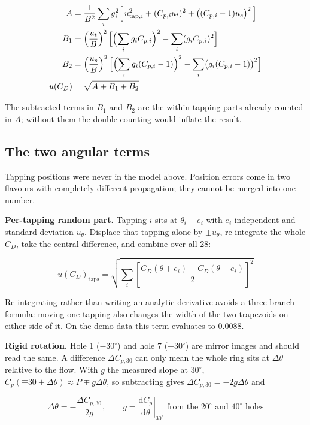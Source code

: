 \documentclass[11pt,a4paper]{article}
\newcommand{\Cp}{\ensuremath{C_p}}
\newcommand{\CD}{\ensuremath{C_D}}
\begin{document}
\begin{align}
A &= \frac{1}{B^2}\sum_i g_i^2\Bigl[\,u_{\text{tap},i}^2 + (C_{p,i} u_t)^2 + \bigl((C_{p,i}-1)u_s\bigr)^2\,\Bigr] \\
B_1 &= \left(\frac{u_t}{B}\right)^2\Bigl[\Bigl(\sum_i g_i C_{p,i}\Bigr)^2 - \sum_i (g_i C_{p,i})^2\Bigr] \\
B_2 &= \left(\frac{u_s}{B}\right)^2\Bigl[\Bigl(\sum_i g_i (C_{p,i}-1)\Bigr)^2 - \sum_i \bigl(g_i (C_{p,i}-1)\bigr)^2\Bigr] \\
u(\CD) &= \sqrt{A + B_1 + B_2}
\end{align}

The subtracted terms in $B_1$ and $B_2$ are the within-tapping parts already counted in $A$;
without them the double counting would inflate the result.

\subsection{The two angular terms}

Tapping positions were never in the model above. Position errors come in two flavours with
completely different propagation; they cannot be merged into one number.

\textbf{Per-tapping random part.} Tapping $i$ sits at $\theta_i + e_i$ with $e_i$ independent and
standard deviation $u_\theta$. Displace that tapping alone by $\pm u_\theta$, re-integrate the whole
\CD, take the central difference, and combine over all 28:

\begin{equation}
u(\CD)_{\text{taps}} = \sqrt{\sum_i \left[\frac{\CD(\theta + e_i) - \CD(\theta - e_i)}{2}\right]^2}
\end{equation}

Re-integrating rather than writing an analytic derivative avoids a three-branch formula: moving one
tapping also changes the width of the two trapezoids on either side of it. On the demo data this
term evaluates to 0.0088.

\textbf{Rigid rotation.} Hole 1 ($-30^\circ$) and hole 7 ($+30^\circ$) are mirror images and should
read the same. A difference $\Delta C_{p,30}$ can only mean the whole ring sits at
$\Delta\theta$ relative to the flow. With $g$ the measured slope at $30^\circ$,
$\Cp(\mp 30 + \Delta\theta) \approx P \mp g\Delta\theta$, so subtracting gives
$\Delta C_{p,30} = -2g\Delta\theta$ and

\begin{equation}
\Delta\theta = -\frac{\Delta C_{p,30}}{2g}, \qquad
g = \left.\frac{\mathrm{d}\Cp}{\mathrm{d}\theta}\right|_{30^\circ}
\text{ from the $20^\circ$ and $40^\circ$ holes}
\end{equation}
\end{document}

